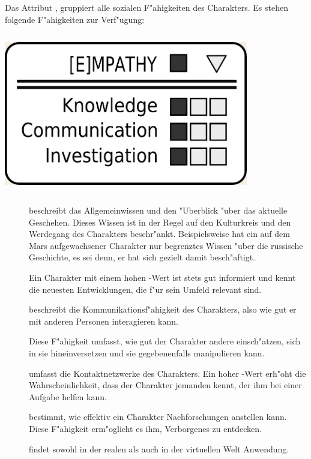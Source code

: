 \medskip
\begin{column}[l]{0.55}
    Das Attribut , gruppiert alle sozialen F"ahigkeiten des Charakters. Es stehen folgende F"ahigkeiten zur Verf"ugung:
\end{column}
\begin{column}[r]{0.45}
    \centering
    \includegraphics[width=0.80\textwidth]{images/character_empathy.jpg}
\end{column}

\begin{description}
    \item[]  beschreibt das Allgemeinwissen und den "Uberblick "uber das aktuelle Geschehen.
        Dieses Wissen ist in der Regel auf den Kulturkreis und den Werdegang des Charakters beschr"ankt. Beispielsweise hat ein auf dem Mars aufgewachsener Charakter nur begrenztes Wissen "uber die russische Geschichte, es sei denn, er hat sich gezielt damit besch"aftigt.

        Ein Charakter mit einem hohen -Wert ist stets gut informiert und kennt die neuesten Entwicklungen, die f"ur sein Umfeld relevant sind.
    \item[]  beschreibt die Kommunikationsf"ahigkeit des Charakters, also wie gut er mit anderen 
        Personen interagieren kann.

        Diese F"ahigkeit umfasst, wie gut der Charakter andere einsch"atzen, sich in sie hineinversetzen und sie gegebenenfalls manipulieren kann.

         umfasst die Kontaktnetzwerke des Charakters. Ein hoher -Wert erh"oht die Wahrscheinlichkeit, dass der Charakter jemanden kennt, der ihm bei einer Aufgabe helfen kann.
    \item[]  bestimmt, wie effektiv ein Charakter Nachforschungen anstellen kann. Diese F"ahigkeit 
        erm"oglicht es ihm, Verborgenes zu entdecken.

         findet sowohl in der realen als auch in der virtuellen Welt Anwendung.
\end{description}

